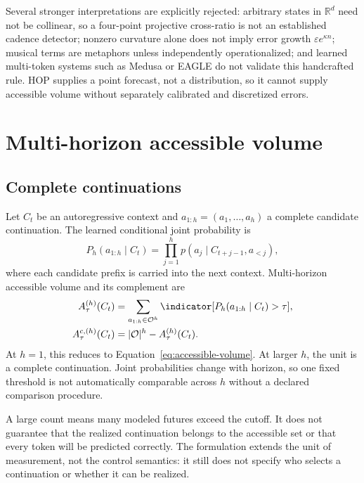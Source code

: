 Several stronger interpretations are explicitly rejected: arbitrary states in $\mathbb R^d$ need not be collinear, so a four-point projective cross-ratio is not an established cadence detector; nonzero curvature alone does not imply error growth $\varepsilon e^{\kappa n}$; musical terms are metaphors unless independently operationalized; and learned multi-token systems such as Medusa or EAGLE do not validate this handcrafted rule. HOP supplies a point forecast, not a distribution, so it cannot supply accessible volume without separately calibrated and discretized errors.

\section{Multi-horizon accessible volume}
\subsection{Complete continuations}
Let $C_t$ be an autoregressive context and $a_{1:h}=(a_1,\ldots,a_h)$ a complete candidate continuation. The learned conditional joint probability is
\begin{equation}
P_h(a_{1:h}\mid C_t)=
\prod_{j=1}^{h}p(a_j\mid C_{t+j-1},a_{<j}),
\label{eq:joint-continuation}
\end{equation}
where each candidate prefix is carried into the next context. Multi-horizon accessible volume and its complement are
\begin{align}
A^{(h)}_\tau(C_t)&=\sum_{a_{1:h}\in\mathcal O^h}
\indicator[P_h(a_{1:h}\mid C_t)>\tau],\label{eq:multi-horizon}\\
A^{c,(h)}_\tau(C_t)&=|\mathcal O|^h-A^{(h)}_\tau(C_t).
\end{align}
At $h=1$, this reduces to Equation~\eqref{eq:accessible-volume}. At larger $h$, the unit is a complete continuation. Joint probabilities change with horizon, so one fixed threshold is not automatically comparable across $h$ without a declared comparison procedure.

A large count means many modeled futures exceed the cutoff. It does not guarantee that the realized continuation belongs to the accessible set or that every token will be predicted correctly. The formulation extends the unit of measurement, not the control semantics: it still does not specify who selects a continuation or whether it can be realized.

